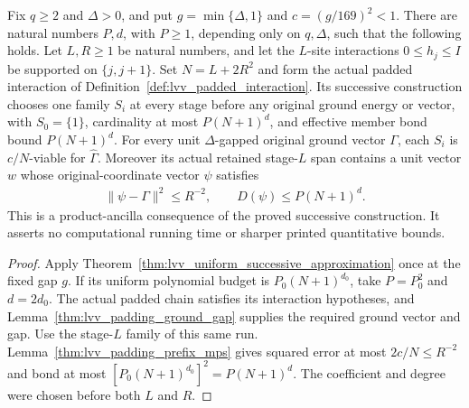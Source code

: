 \begin{theorem}
    \label{thm:lvv_successive_arbitrary_accuracy}
    \leanok
    Fix $q\ge2$ and $\Delta>0$, and put
    $g=\min\{\Delta,1\}$ and $c=(g/169)^2<1$.
    There are natural numbers $P,d$, with $P\ge1$, depending only on
    $q,\Delta$, such that the following holds.
    Let $L,R\ge1$ be natural numbers, and let the $L$-site interactions
    $0\le h_j\le I$ be supported on $\{j,j+1\}$.
    Set $N=L+2R^2$ and form the actual padded interaction of
    Definition~\ref{def:lvv_padded_interaction}.
    Its successive construction chooses one family $S_i$ at every stage
    before any original ground energy or vector, with $S_0=\{1\}$,
    cardinality at most $P(N+1)^d$, and effective member bond bound
    $P(N+1)^d$.
    For every unit $\Delta$-gapped original ground vector $\Gamma$,
    each $S_i$ is $c/N$-viable for $\widehat\Gamma$.
    Moreover its actual retained stage-$L$ span contains a unit vector $w$
    whose original-coordinate vector $\psi$ satisfies
    \begin{align*}
        \|\psi-\Gamma\|^2\le R^{-2},
        \qquad D(\psi)\le P(N+1)^d.
    \end{align*}
    This is a product-ancilla consequence of the proved successive
    construction. It asserts no computational running time or sharper
    printed quantitative bounds.
\end{theorem}
\begin{proof}
    \leanok
    Apply Theorem~\ref{thm:lvv_uniform_successive_approximation} once at
    the fixed gap $g$. If its uniform polynomial budget is $P_0(N+1)^{d_0}$,
    take $P=P_0^2$ and $d=2d_0$.
    The actual padded chain satisfies its interaction hypotheses, and
    Lemma~\ref{thm:lvv_padding_ground_gap} supplies the required
    ground vector and gap. Use the stage-$L$ family of this same run.
    Lemma~\ref{thm:lvv_padding_prefix_mps} gives squared error at most
    $2c/N\le R^{-2}$ and bond at most
    $[P_0(N+1)^{d_0}]^2=P(N+1)^d$.
    The coefficient and degree were chosen before both $L$ and $R$.
\end{proof}
